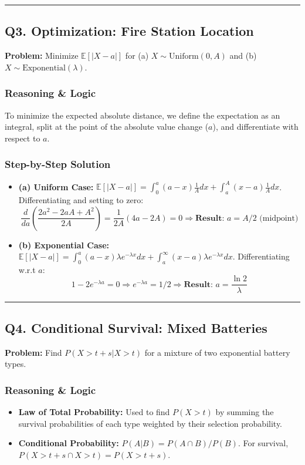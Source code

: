 \documentclass[11pt]{article}
\begin{document}
\vspace{0.5cm}
\hrule
\vspace{0.5cm}

\subsection*{Q3. Optimization: Fire Station Location}

\textbf{Problem:} Minimize $\mathbb{E}[|X-a|]$ for (a) $X \sim \text{Uniform}(0, A)$ and (b) $X \sim \text{Exponential}(\lambda)$.

\subsubsection*{Reasoning \& Logic}
To minimize the expected absolute distance, we define the expectation as an integral, split at the point of the absolute value change ($a$), and differentiate with respect to $a$.

\subsubsection*{Step-by-Step Solution}
\begin{itemize}
    \item \textbf{(a) Uniform Case:} $\mathbb{E}[|X-a|] = \int_{0}^{a}(a-x)\frac{1}{A}dx + \int_{a}^{A}(x-a)\frac{1}{A}dx$. Differentiating and setting to zero: 
    \[ \frac{d}{da}\left(\frac{2a^2-2aA+A^2}{2A}\right) = \frac{1}{2A}(4a-2A) = 0 \Rightarrow \textbf{Result: } a = A/2 \text{ (midpoint)} \]
    \item \textbf{(b) Exponential Case:} $\mathbb{E}[|X-a|] = \int_{0}^{a}(a-x)\lambda e^{-\lambda x}dx + \int_{a}^{\infty}(x-a)\lambda e^{-\lambda x}dx$. Differentiating w.r.t $a$: 
    \[ 1 - 2e^{-\lambda a} = 0 \Rightarrow e^{-\lambda a} = 1/2 \Rightarrow \textbf{Result: } a = \frac{\ln 2}{\lambda} \]
\end{itemize}

\vspace{0.5cm}
\hrule
\vspace{0.5cm}

\subsection*{Q4. Conditional Survival: Mixed Batteries}

\textbf{Problem:} Find $P(X > t+s | X > t)$ for a mixture of two exponential battery types.

\subsubsection*{Reasoning \& Logic}
\begin{itemize}
    \item \textbf{Law of Total Probability:} Used to find $P(X > t)$ by summing the survival probabilities of each type weighted by their selection probability.
    \item \textbf{Conditional Probability:} $P(A|B) = P(A \cap B)/P(B)$. For survival, $P(X > t+s \cap X > t) = P(X > t+s)$.
\end{itemize}
\end{document}
